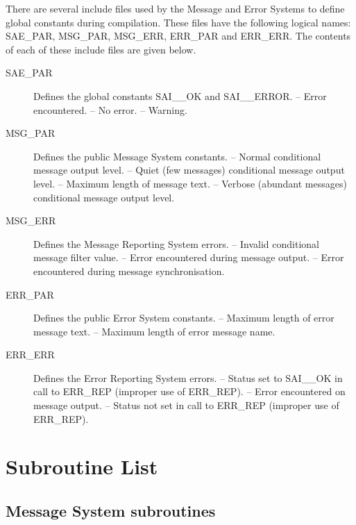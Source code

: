 There are several include files used by the Message and Error Systems to define
global constants during compilation.
These files have the following logical names: SAE\_PAR, MSG\_PAR, MSG\_ERR, 
ERR\_PAR and ERR\_ERR.
The contents of each of these include files are given below.

\begin {description}
\item [SAE\_PAR] Defines the global constants SAI\_\_OK and SAI\_\_ERROR.
 -- Error encountered.
 -- No error.
 -- Warning.
\indexspace
\item [MSG\_PAR] Defines the public Message System constants.
 -- Normal conditional message output level.
 -- Quiet (few messages) conditional message output 
level.
 -- Maximum length of message text.
 -- Verbose (abundant messages) conditional message
output level.
\indexspace
\item [MSG\_ERR] Defines the Message Reporting System errors.
 -- Invalid conditional message filter value.
 -- Error encountered during message output.
 -- Error encountered during message
synchronisation.
\indexspace
\item [ERR\_PAR] Defines the public Error System constants.
 -- Maximum length of error message text.
 -- Maximum length of error message name.
\indexspace
\item [ERR\_ERR] Defines the Error Reporting System errors.
 -- Status set to SAI\_\_OK in call to ERR\_REP
(improper use of ERR\_REP).
 -- Error encountered on message output. 
 -- Status not set in call to ERR\_REP (improper
use of ERR\_REP). 
\end {description}


\newpage
\section {Subroutine List}

\subsection {Message System subroutines}

